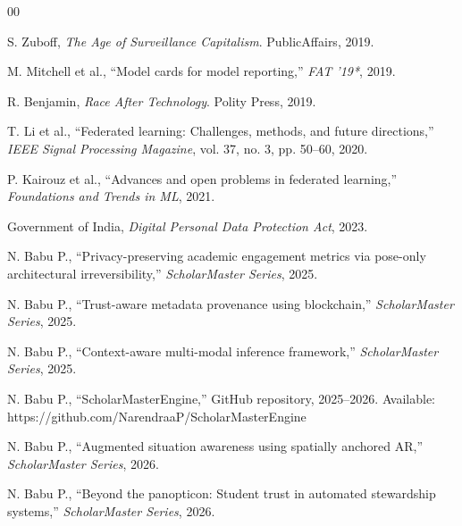 \documentclass[conference]{IEEEtran}
\begin{document}
\begin{thebibliography}{00}

 S. Zuboff, \textit{The Age of Surveillance Capitalism}. PublicAffairs, 2019.

 M. Mitchell et al., ``Model cards for model reporting,'' \textit{FAT '19*}, 2019.


 R. Benjamin, \textit{Race After Technology}. Polity Press, 2019.

 T. Li et al., ``Federated learning: Challenges, methods, and future directions,'' \textit{IEEE Signal Processing Magazine}, vol. 37, no. 3, pp. 50--60, 2020.

 P. Kairouz et al., ``Advances and open problems in federated learning,'' \textit{Foundations and Trends in ML}, 2021.


 Government of India, \textit{Digital Personal Data Protection Act}, 2023.

 N. Babu P., ``Privacy-preserving academic engagement metrics via pose-only architectural irreversibility,'' \textit{ScholarMaster Series}, 2025.

 N. Babu P., ``Trust-aware metadata provenance using blockchain,'' \textit{ScholarMaster Series}, 2025.

 N. Babu P., ``Context-aware multi-modal inference framework,'' \textit{ScholarMaster Series}, 2025.

 N. Babu P., ``ScholarMasterEngine,'' GitHub repository, 2025--2026. Available: https://github.com/NarendraaP/ScholarMasterEngine

 N. Babu P., ``Augmented situation awareness using spatially anchored AR,'' \textit{ScholarMaster Series}, 2026.

 N. Babu P., ``Beyond the panopticon: Student trust in automated stewardship systems,'' \textit{ScholarMaster Series}, 2026.


\end{thebibliography}
\end{document}
